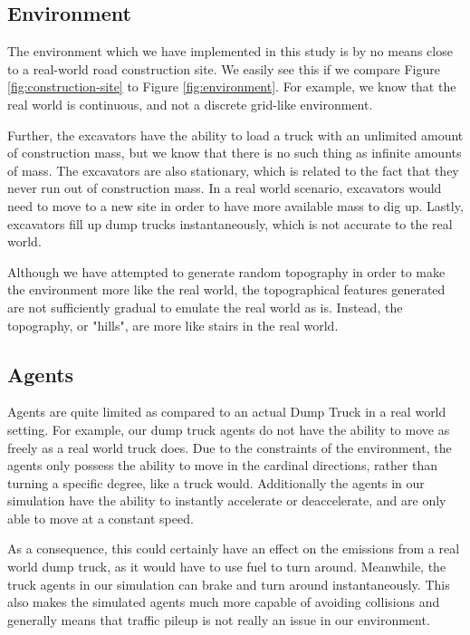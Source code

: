 \documentclass[conference]{IEEEtran}
\begin{document}
	\subsection{Environment}
	The environment which we have implemented in this study is by no means close to a
	real-world road construction site. We easily see this if we compare Figure \ref{fig:construction-site}
	to Figure \ref{fig:environment}. For example, we know that the real world is continuous, and not a discrete
	grid-like environment.

Further, the excavators have the ability to load a truck with an unlimited amount of construction mass,
but we know that there is no such thing as infinite amounts of mass. The excavators are also stationary,
which is related to the fact that they never run out of construction mass. In a real world scenario,
excavators would need to move to a new site in order to have more available mass to dig up. Lastly,
excavators fill up dump trucks instantaneously, which is not accurate to the real world.

Although we have attempted to generate random topography in order to make the environment more like
the real world, the topographical features generated are not sufficiently gradual to emulate the real world as is.
Instead, the topography, or "hills", are more like stairs in the real world.


\subsection{Agents}
Agents are quite limited as compared to an actual Dump Truck in a real world setting. For example,
our dump truck agents do not have the ability to move as freely as a real world truck does. Due to the
constraints of the environment, the agents only possess the ability to move in the cardinal directions,
rather than turning a specific degree, like a truck would. Additionally the agents in our simulation have the
ability to instantly accelerate or deaccelerate, and are only able to move at a constant speed.

As a consequence, this could certainly have an effect on the emissions from a real world dump truck, as
it would have to use fuel to turn around. Meanwhile, the truck agents in our simulation can brake and turn around
instantaneously. This also makes the simulated agents much more capable of avoiding collisions and generally means that traffic pileup is not really an issue in our environment.
\end{document}
